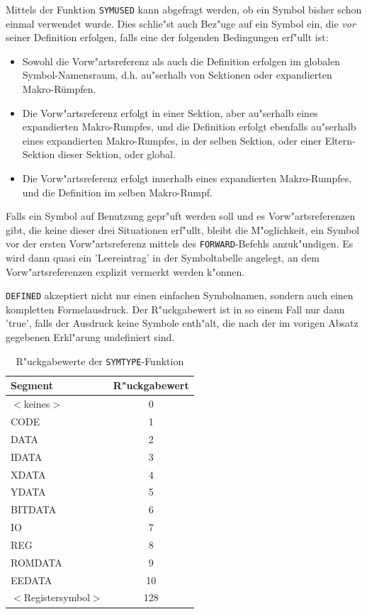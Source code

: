 \documentclass[12pt,a4paper,twoside]{report}
\newcommand{\tty}[1]{{\tt #1}}
\begin{document}
\label{sect_symused}
Mittels der Funktion \tty{SYMUSED} kann abgefragt werden, ob ein Symbol
bisher schon einmal verwendet wurde.  Dies schlie"st auch Bez"uge auf
ein Symbol ein, die {\em vor} seiner Definition erfolgen, falls
eine der folgenden Bedingungen erf"ullt ist:
\begin{itemize}
\item{Sowohl die Vorw"artsreferenz als auch die Definition erfolgen im
      globalen Symbol-Namensraum, d.h. au"serhalb von Sektionen oder
      expandierten Makro-Rümpfen.}
\item{Die Vorw"artsreferenz erfolgt in einer Sektion, aber au"serhalb
      eines expandierten Makro-Rumpfes, und die Definition erfolgt ebenfalls
      au"serhalb eines expandierten Makro-Rumpfes, in der selben Sektion, oder
      einer Eltern-Sektion dieser Sektion, oder global.}
\item{Die Vorw"artsreferenz erfolgt innerhalb eines expandierten Makro-Rumpfes,
      und die Definition im selben Makro-Rumpf.}
\end{itemize}
Falls ein Symbol auf Benutzung gepr"uft werden soll und es Vorw"artsreferenzen
gibt, die keine dieser drei Situationen erf"ullt, bleibt die M"oglichkeit,
ein Symbol vor der ersten Vorw"artsreferenz mittels des \tty{FORWARD}-Befehls
anzuk"undigen.  Es wird dann quasi ein 'Leereintrag' in der Symboltabelle
angelegt, an dem Vorw"artsreferenzen explizit vermerkt werden k"onnen.

\tty{DEFINED} akzeptiert nicht nur einen einfachen Symbolnamen, sondern auch
einen kompletten Formelausdruck.  Der R"uckgabewert ist in so einem Fall
nur dann 'true', falls der Ausdruck keine Symbole enth"alt, die nach der im
vorigen Absatz gegebenen Erkl"arung undefiniert sind.
\begin{table}[htb]
\begin{center}
\begin{tabular}{|l|c|}
\hline
Segment & R"uckgabewert \\
\hline
$<$keines$>$ & 0 \\
CODE & 1 \\
DATA & 2 \\
IDATA & 3 \\
XDATA & 4 \\
YDATA & 5 \\
BITDATA & 6 \\
IO & 7 \\
REG & 8 \\
ROMDATA & 9 \\
EEDATA & 10 \\
$<$Registersymbol$>$ & 128 \\
\hline
\end{tabular}
\end{center}
\caption{R"uckgabewerte der \tty{SYMTYPE}-Funktion\label{TabSegNums}}
\end{table}
\end{document}
